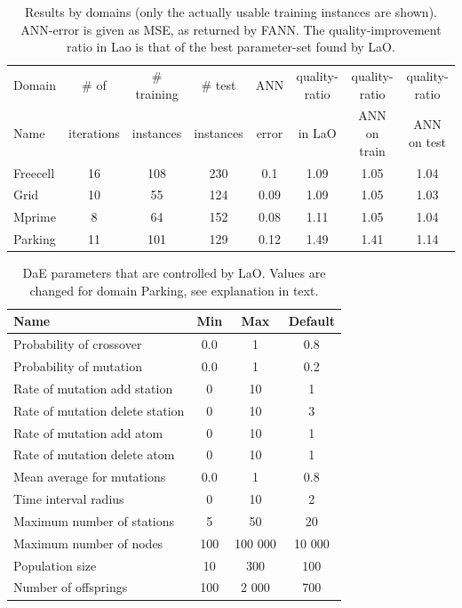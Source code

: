 \documentclass[runningheads,a4paper]{llncs}
\begin{document}
\begin{table}[ht]
\centering
\begin{tabular}{l c c c c c c c}
\hline\hline
Domain & \# of & \# training & \# test &  ANN & quality-ratio & quality-ratio & quality-ratio \\ 
Name & iterations  & instances &  instances &  error & in LaO & ANN on train & ANN on test \\ 
\hline
Freecell& 16 & 108 & 230 & 0.1 & 1.09 & 1.05 & 1.04  \\
Grid & 10 & 55 & 124 & 0.09 & 1.09 & 1.05 & 1.03  \\
Mprime & 8 & 64 & 152 & 0.08 & 1.11 & 1.05 & 1.04   \\
Parking & 11 & 101 & 129 & 0.12 &  1.49 & 1.41  & 1.14   \\
\hline
\end{tabular}
\caption{Results by domains (only the actually usable training instances are shown). ANN-error is given as MSE, as returned by FANN. The quality-improvement ratio in Lao is that of the best parameter-set found by LaO.}
\label{table:domains}
\end{table} 


\begin{table}[ht]
\centering
\begin{tabular}{l c c c}
\hline\hline
Name & Min & Max & Default \\ 
\hline
Probability of crossover & 0.0 & 1 & 0.8 \\
Probability of mutation & 0.0& 1& 0.2 \\
Rate of mutation add station& 0& 10& 1 \\
Rate of mutation delete station& 0& 10& 3 \\
Rate of mutation add atom& 0& 10& 1 \\
Rate of mutation delete atom& 0& 10& 1 \\
Mean average for mutations& 0.0& 1& 0.8 \\
Time interval radius& 0& 10& 2 \\
Maximum number of stations& 5& 50& 20 \\
Maximum number of nodes& 100& 100 000& 10 000 \\
Population size& 10& 300& 100 \\
Number of offsprings & 100& 2 000& 700 \\
\hline
\end{tabular}
\caption{DaE parameters that are controlled by LaO. Values are changed for domain Parking, see explanation in text.}
\label{table:parameters}
\end{table} 
\end{document}
